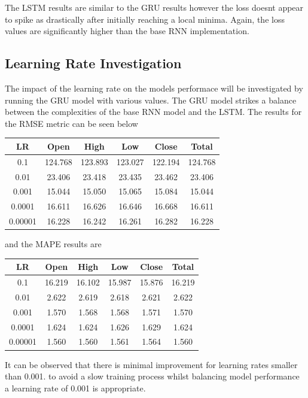 \documentclass[10pt,twocolumn,letterpaper]{article}
\begin{document}
The LSTM results are similar to the GRU results however the loss doesnt appear to spike as 
drastically after initially reaching a local minima. Again, the loss values are significantly 
higher than the base RNN implementation.
\subsection{Learning Rate Investigation}
The impact of the learning rate on the models performace will be investigated by running the 
GRU model with various values. The GRU model strikes a balance between the complexities of 
the base RNN model and the LSTM. The results for the RMSE metric can be seen below
\begin{center}
   \hspace*{-0.8cm}
   \begin{tabular}{||c c c c c c||} 
    \hline
    LR & Open & High & Low & Close & Total\\ [0.5ex] 
    \hline\hline
    0.1  & 124.768& 123.893& 123.027& 122.194& 124.768\\ 
    \hline
    0.01  & 23.406& 23.418& 23.435& 23.462& 23.406 \\
    \hline
    0.001  & 15.044& 15.050& 15.065& 15.084& 15.044 \\
    \hline
    0.0001  & 16.611& 16.626& 16.646& 16.668& 16.611 \\
    \hline
    0.00001 & 16.228& 16.242& 16.261& 16.282& 16.228 \\
    \hline
   \end{tabular}
\end{center}
and the MAPE results are   
\begin{center}
   \begin{tabular}{||c c c c c c||} 
    \hline
    LR & Open & High & Low & Close & Total\\ [0.5ex] 
    \hline\hline
    0.1  & 16.219& 16.102& 15.987& 15.876& 16.219\\ 
    \hline
    0.01   & 2.622& 2.619& 2.618& 2.621& 2.622 \\
    \hline
    0.001  & 1.570& 1.568& 1.568& 1.571& 1.570 \\
    \hline
    0.0001  & 1.624& 1.624& 1.626& 1.629& 1.624 \\
    \hline
    0.00001  & 1.560& 1.560& 1.561& 1.564& 1.560 \\    
    \hline
   \end{tabular}
\end{center}
It can be observed that there is minimal improvement for learning rates smaller than 0.001.
to avoid a slow training process whilst balancing model performance a learning rate of 
0.001 is appropriate.
\end{document}
